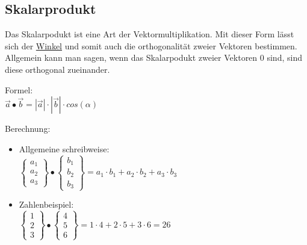 \subsection{Skalarprodukt}
\label{sec:skalarprodukt}
Das Skalarpodukt ist eine Art der Vektormultiplikation.
Mit dieser Form lässt sich der 
\hyperref[sec:winkel_vektoren]{Winkel}
und somit auch die orthogonalität zweier Vektoren bestimmen. 
Allgemein kann man sagen, wenn das Skalarpodukt zweier Vektoren $0$ sind, sind diese orthogonal zueinander.
\par
Formel: \\
$
\vec{a} \bullet \vec{b} = |\vec{a}| \cdot |\vec{b}| \cdot cos(\alpha)
$
\par
Berechnung:
\begin{itemize}

    \item Allgemeine schreibweise: \\
    $
    \begin{Bmatrix}
        a_1 \\ a_2 \\ a_3
    \end{Bmatrix}
    \bullet 
    \begin{Bmatrix}
        b_1 \\ b_2 \\ b_3
    \end{Bmatrix}
    =
    a_1 \cdot b_1 + a_2 \cdot b_2 + a_3 \cdot b_3
    $
    \item Zahlenbeispiel: \\
    $
    \begin{Bmatrix}
        1 \\ 2 \\ 3
    \end{Bmatrix}
    \bullet
    \begin{Bmatrix}
    4 \\ 5 \\ 6
    \end{Bmatrix}
    = 
    1 \cdot 4 + 2 \cdot 5 + 3 \cdot 6 = 26
    $
\end{itemize}

